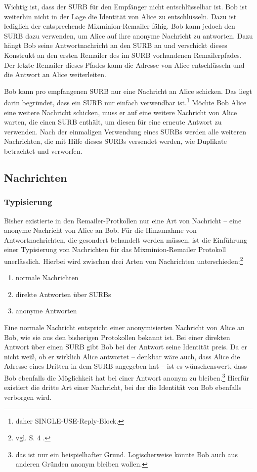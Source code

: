 Wichtig ist, dass der SURB für den Empfänger nicht entschlüsselbar ist. Bob ist weiterhin nicht in der Lage die Identität von Alice zu entschlüsseln. Dazu ist lediglich der entsprechende Mixminion-Remailer fähig. Bob kann jedoch den SURB dazu verwenden, um Alice auf ihre anonyme Nachricht zu antworten. Dazu hängt Bob seine Antwortnachricht an den SURB an und verschickt dieses Konstrukt an den ersten Remailer des im SURB vorhandenen Remailerpfades. Der letzte Remailer dieses Pfades kann die Adresse von Alice entschlüsseln und die Antwort an Alice weiterleiten.

Bob kann pro empfangenen SURB nur eine Nachricht an Alice schicken. Das liegt darin begründet, dass ein SURB nur einfach verwendbar ist.\footnote{daher SINGLE-USE-Reply-Block.} Möchte Bob Alice eine weitere Nachricht schicken, muss er auf eine weitere Nachricht von Alice warten, die einen SURB enthält, um diesen für eine erneute Antwort zu verwenden. Nach der einmaligen Verwendung eines SURBs werden alle weiteren Nachrichten, die mit Hilfe dieses SURBs versendet werden, wie Duplikate betrachtet und verworfen.

\subsection{Nachrichten}
\subsubsection{Typisierung}
Bisher existierte in den Remailer-Protkollen nur eine Art von Nachricht -- eine anonyme Nachricht von Alice an Bob. Für die Hinzunahme von Antwortnachrichten, die gesondert behandelt werden müssen, ist die Einführung einer Typisierung von Nachrichten für das Mixminion-Remailer Protokoll unerlässlich. Hierbei wird zwischen drei Arten von Nachrichten unterschieden:\footnote{vgl. S. 4 \cite{mixminion}.}

\begin{enumerate}
\item normale Nachrichten
\item direkte Antworten über SURBs
\item anonyme Antworten
\end{enumerate}

Eine normale Nachricht entspricht einer anonymisierten Nachricht von Alice an Bob, wie sie aus den bisherigen Protokollen bekannt ist. Bei einer direkten Antwort über einen SURB gibt Bob bei der Antwort seine Identität preis. Da er nicht weiß, ob er wirklich Alice antwortet -- denkbar wäre auch, dass Alice die Adresse eines Dritten in dem SURB angegeben hat -- ist es wünschenswert, dass Bob ebenfalls die Möglichkeit hat bei einer Antwort anonym zu bleiben.\footnote{das ist nur ein beispielhafter Grund. Logischerweise könnte Bob auch aus anderen Gründen anonym bleiben wollen.} Hierfür existiert die dritte Art einer Nachricht, bei der die Identität von Bob ebenfalls verborgen wird.

